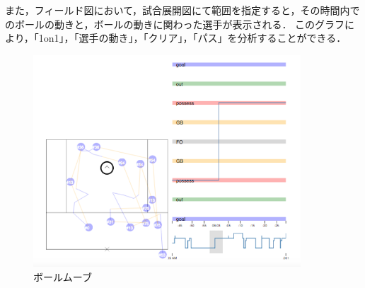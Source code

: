 \documentclass[sotsuron]{kuee}
\begin{document}
				また，フィールド図において，試合展開図にて範囲を指定すると，その時間内でのボールの動きと，ボールの動きに関わった選手が表示される．
				このグラフにより，「1on1」，「選手の動き」，「クリア」，「パス」を分析することができる．
					\begin{figure}
						\begin{center}
							\includegraphics[width=10cm]{./png/ballmove.png}
						\end{center}
						\caption{ボールムーブ}
				  		\label{fig:ballmove}
					\end{figure}
\end{document}
